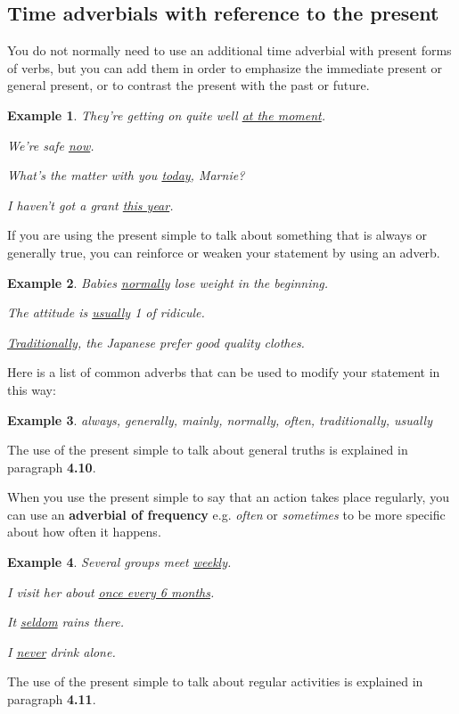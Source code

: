 \documentclass[oneside]{book}
\numberwithin{equation}{section}
\newtheorem{example}{Example}[section]
\begin{document}
\subsection{Time adverbials with reference to the present}
\noindent{} You do not normally need to use an additional time adverbial with present forms of verbs, but you can add them in order to emphasize the immediate present or general present, or to contrast the present with the past or future.
\begin{example}
    They're getting on quite well \underline{at the moment}.
    
    We're safe \underline{now}.
    
    What's the matter with you \underline{today}, Marnie?
    
    I haven't got a grant \underline{this year}.
\end{example}
%
\noindent{} If you are using the present simple to talk about something that is always or generally true, you can reinforce or weaken your statement by using an adverb.
\begin{example}
    Babies \underline{normally} lose weight in the beginning.
    
    The attitude is \underline{usually} 1 of ridicule.
    
    \underline{Traditionally}, the Japanese prefer good quality clothes.
\end{example}
Here is a list of common adverbs that can be used to modify your statement in this way:
\begin{example}
    always, generally, mainly, normally, often, traditionally, usually
\end{example}
The use of the present simple to talk about general truths is explained in paragraph \textbf{4.10}.

%
\noindent{} When you use the present simple to say that an action takes place regularly, you can use an \textbf{adverbial of frequency} e.g. \textit{often} or \textit{sometimes} to be more specific about how often it happens.
\begin{example}
    Several groups meet \underline{weekly}.
    
    I visit her about \underline{once every 6 months}.
    
    It \underline{seldom} rains there.
    
    I \underline{never} drink alone.
\end{example}
The use of the present simple to talk about regular activities is explained in paragraph \textbf{4.11}.
\end{document}
